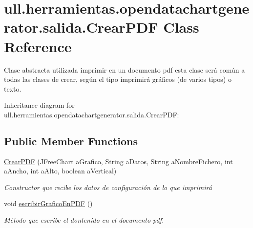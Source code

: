 \hypertarget{classull_1_1herramientas_1_1opendatachartgenerator_1_1salida_1_1_crear_p_d_f}{}\section{ull.\+herramientas.\+opendatachartgenerator.\+salida.\+Crear\+P\+DF Class Reference}
\label{classull_1_1herramientas_1_1opendatachartgenerator_1_1salida_1_1_crear_p_d_f}


Clase abstracta utilizada imprimir en un documento pdf esta clase será común a todas las clases de crear, según el tipo imprimirá gráficos (de varios tipos) o texto.  




Inheritance diagram for ull.\+herramientas.\+opendatachartgenerator.\+salida.\+Crear\+P\+DF\+:
\subsection*{Public Member Functions}
\begin{DoxyCompactItemize}
\item 
\mbox{\hyperlink{classull_1_1herramientas_1_1opendatachartgenerator_1_1salida_1_1_crear_p_d_f_acd132a09817a3498db8e34ffa53ec8ce}{Crear\+P\+DF}} (J\+Free\+Chart a\+Grafico, String a\+Datos, String a\+Nombre\+Fichero, int a\+Ancho, int a\+Alto, boolean a\+Vertical)
\begin{DoxyCompactList}\small\item\em Constructor que recibe los datos de configuración de lo que imprimirá \end{DoxyCompactList}\item 
\mbox{\label{classull_1_1herramientas_1_1opendatachartgenerator_1_1salida_1_1_crear_p_d_f_a3d02408a17f3b0d7aa227af11c0904a8}} 
void \mbox{\hyperlink{classull_1_1herramientas_1_1opendatachartgenerator_1_1salida_1_1_crear_p_d_f_a3d02408a17f3b0d7aa227af11c0904a8}{escribir\+Grafico\+En\+P\+DF}} ()
\begin{DoxyCompactList}\small\item\em Método que escribe el dontenido en el documento pdf. \end{DoxyCompactList}\end{DoxyCompactItemize}


